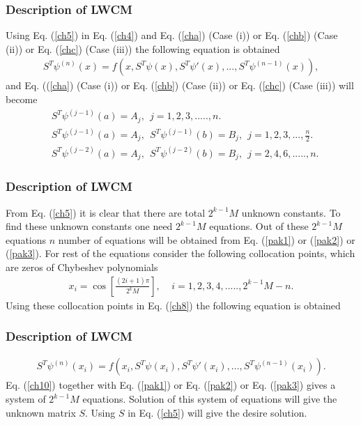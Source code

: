 \documentclass{beamer}
\begin{document}
\begin{frame}\frametitle{Description of LWCM}
\justifying
	Using Eq. (\ref{ch5}) in Eq. (\ref{ch4}) and Eq. (\ref{cha}) (Case (i)) or Eq. (\ref{chb}) (Case (ii)) or Eq. (\ref{chc}) (Case (iii)) the following equation is obtained
	\begin{eqnarray}\label{ch8}
	S^{T}\psi^{(n)}(x)=f(x,S^{T}\psi(x), S^{T}\psi'(x),...,S^{T}\psi^{(n-1)}(x)),
	\end{eqnarray}
	\small
	\normalsize
	and Eq. ((\ref{cha}) (Case (i)) or Eq. (\ref{chb}) (Case (ii)) or Eq. (\ref{chc}) (Case (iii)) will become
	\begin{align}
	&S^{T}\psi^{(j-1)}(a)=A_{j},~~j=1, 2, 3,.....,n.\label{pak1}\\
	&S^{T}\psi^{(j-1)}(a)=A_{j},~~S^{T}\psi^{(j-1)}(b)=B_{j},~~j=1, 2, 3,...,\frac{n}{2}.\label{pak2}\\
	&S^{T}\psi^{(j-2)}(a)=A_{j},~~S^{T}\psi^{(j-2)}(b)=B_{j},~~j=2, 4, 6,.....,n.\label{pak3}
	\end{align}
	\small
	\normalsize   
\end{frame}
\begin{frame}\frametitle{Description of LWCM}
	\justifying
 From Eq. (\ref{ch5}) it is clear that there are total $2^{k-1}M$  unknown constants. To find these unknown constants one need $2^{k-1}M$ equations. Out of these $2^{k-1}M$ equations $n$ number of equations will be obtained from Eq. (\ref{pak1}) or (\ref{pak2}) or (\ref{pak3}).
  For rest of the equations consider the following collocation points, which are zeros of Chybeshev polynomials \cite{Sadeghi}
  \begin{eqnarray}\label{9}
  x_{i}=\cos\left[\frac{(2i+1)\pi}{2^{k}M}\right], ~~~~~i=1, 2, 3, 4, .....,2^{k-1}M-n.
  \end{eqnarray}
  \small
 Using these collocation points in Eq. (\ref{ch8}) the following equation is obtained
\end{frame}
\begin{frame}\frametitle{Description of LWCM}
\justifying
 \begin{eqnarray}\label{ch10}
 S^{T}\psi^{(n)}(x_{i})=f(x_{i},S^{T}\psi(x_{i}), S^{T}\psi'(x_{i}),...,S^{T}\psi^{(n-1)}(x_{i})).
 \end{eqnarray}
Eq. (\ref{ch10}) together with Eq. (\ref{pak1}) or Eq. (\ref{pak2}) or Eq. (\ref{pak3}) gives a system of ${2^{k-1}M}$ equations. Solution of this system of equations will give the unknown matrix $S$. Using $S$ in Eq. (\ref{ch5}) will give the desire solution.
\end{frame}	
\end{document}

